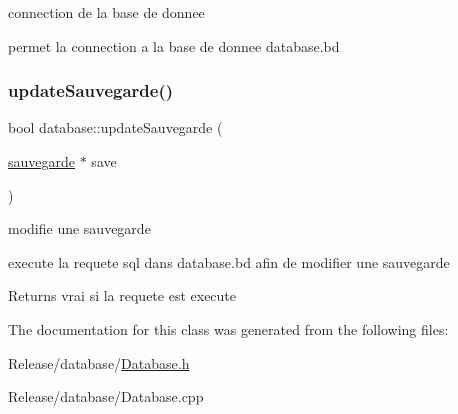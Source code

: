connection de la base de donnee 

permet la connection a la base de donnee database.\+bd \mbox{\label{classdatabase_a5112834fd0407d9bd04eabf5a2ebe705}} 
\subsubsection{\texorpdfstring{update\+Sauvegarde()}{updateSauvegarde()}}
{\footnotesize\ttfamily bool database\+::update\+Sauvegarde (\begin{DoxyParamCaption}\item[{\mbox{\hyperlink{classsauvegarde}{sauvegarde}} $\ast$}]{save }\end{DoxyParamCaption})}



modifie une sauvegarde 

execute la requete sql dans database.\+bd afin de modifier une sauvegarde

\begin{DoxyReturn}{Returns}
vrai si la requete est execute 
\end{DoxyReturn}


The documentation for this class was generated from the following files\+:\begin{DoxyCompactItemize}
\item 
Release/database/\mbox{\hyperlink{_database_8h}{Database.\+h}}\item 
Release/database/Database.\+cpp\end{DoxyCompactItemize}
